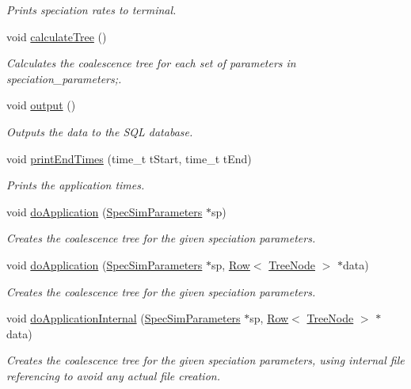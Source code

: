 \begin{DoxyCompactItemize}
\begin{DoxyCompactList}\small\item\em Prints speciation rates to terminal. \end{DoxyCompactList}\item 
void \hyperlink{class_community_adfa9a1c84bb326092805614ad195fcdd}{calculate\+Tree} ()\hypertarget{class_community_adfa9a1c84bb326092805614ad195fcdd}{}\label{class_community_adfa9a1c84bb326092805614ad195fcdd}

\begin{DoxyCompactList}\small\item\em Calculates the coalescence tree for each set of parameters in speciation\+\_\+parameters;. \end{DoxyCompactList}\item 
void \hyperlink{class_community_ad2483623c7ad7a11564fc49305204585}{output} ()
\begin{DoxyCompactList}\small\item\em Outputs the data to the S\+QL database. \end{DoxyCompactList}\item 
void \hyperlink{class_community_a36216913433e3e011ee2420e83e1fe4a}{print\+End\+Times} (time\+\_\+t t\+Start, time\+\_\+t t\+End)
\begin{DoxyCompactList}\small\item\em Prints the application times. \end{DoxyCompactList}\item 
void \hyperlink{class_community_a8ce443a30731d2249852d2b615f4a29a}{do\+Application} (\hyperlink{struct_spec_sim_parameters}{Spec\+Sim\+Parameters} $\ast$sp)
\begin{DoxyCompactList}\small\item\em Creates the coalescence tree for the given speciation parameters. \end{DoxyCompactList}\item 
void \hyperlink{class_community_a7289dd39ee9b69ca314e1752a7b45701}{do\+Application} (\hyperlink{struct_spec_sim_parameters}{Spec\+Sim\+Parameters} $\ast$sp, \hyperlink{class_row}{Row}$<$ \hyperlink{class_tree_node}{Tree\+Node} $>$ $\ast$data)
\begin{DoxyCompactList}\small\item\em Creates the coalescence tree for the given speciation parameters. \end{DoxyCompactList}\item 
void \hyperlink{class_community_aee7488d02cccb897ed1d561e242391df}{do\+Application\+Internal} (\hyperlink{struct_spec_sim_parameters}{Spec\+Sim\+Parameters} $\ast$sp, \hyperlink{class_row}{Row}$<$ \hyperlink{class_tree_node}{Tree\+Node} $>$ $\ast$data)
\begin{DoxyCompactList}\small\item\em Creates the coalescence tree for the given speciation parameters, using internal file referencing to avoid any actual file creation. \end{DoxyCompactList}\end{DoxyCompactItemize}
